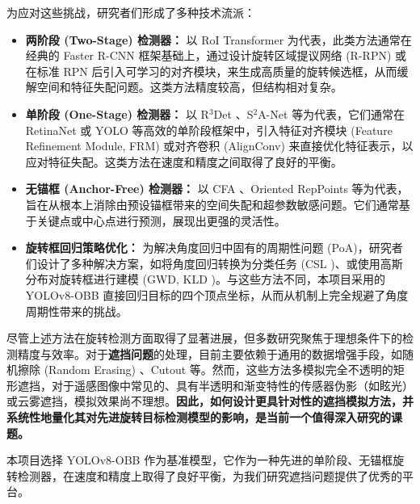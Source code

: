 \documentclass[12pt, a4paper]{report}
\begin{document}
为应对这些挑战，研究者们形成了多种技术流派：
\begin{itemize}
    \item \textbf{两阶段 (Two-Stage) 检测器：} 以 RoI Transformer \cite{roitransformer} 为代表，此类方法通常在经典的 Faster R-CNN 框架基础上，通过设计旋转区域提议网络 (R-RPN) 或在标准 RPN 后引入可学习的对齐模块，来生成高质量的旋转候选框，从而缓解空间和特征失配问题。这类方法精度较高，但结构相对复杂。
    \item \textbf{单阶段 (One-Stage) 检测器：} 以 R$^3$Det \cite{r3det}、S$^2$A-Net \cite{s2anet} 等为代表，它们通常在 RetinaNet 或 YOLO 等高效的单阶段框架中，引入特征对齐模块 (Feature Refinement Module, FRM) 或对齐卷积 (AlignConv) 来直接优化特征表示，以应对特征失配。这类方法在速度和精度之间取得了良好的平衡。
    \item \textbf{无锚框 (Anchor-Free) 检测器：} 以 CFA \cite{cfa}、Oriented RepPoints 等为代表，旨在从根本上消除由预设锚框带来的空间失配和超参数敏感问题。它们通常基于关键点或中心点进行预测，展现出更强的灵活性。
    \item \textbf{旋转框回归策略优化：} 为解决角度回归中固有的周期性问题 (PoA)，研究者们设计了多种解决方案，如将角度回归转换为分类任务 (CSL \cite{csl})、或使用高斯分布对旋转框进行建模 (GWD, KLD \cite{gwd})。与这些方法不同，本项目采用的 YOLOv8-OBB 直接回归目标的四个顶点坐标，从而从机制上完全规避了角度周期性带来的挑战。
\end{itemize}

尽管上述方法在旋转检测方面取得了显著进展，但多数研究聚焦于理想条件下的检测精度与效率。对于\textbf{遮挡问题}的处理，目前主要依赖于通用的数据增强手段，如随机擦除 (Random Erasing) \cite{randomerasing}、Cutout 等。然而，这些方法多模拟完全不透明的矩形遮挡，对于遥感图像中常见的、具有半透明和渐变特性的传感器伪影（如眩光）或云雾遮挡，模拟效果尚不理想。\textbf{因此，如何设计更具针对性的遮挡模拟方法，并系统性地量化其对先进旋转目标检测模型的影响，是当前一个值得深入研究的课题。}

本项目选择 YOLOv8-OBB 作为基准模型，它作为一种先进的单阶段、无锚框旋转检测器，在速度和精度上取得了良好平衡，为我们研究遮挡问题提供了优秀的平台。
\end{document}
